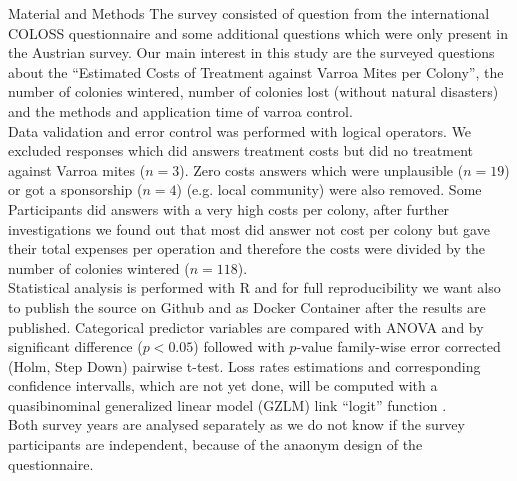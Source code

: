\documentclass{beamer}
\begin{document}
\begin{frame}{}
\begin{columns}[t]
\begin{column}{0.49\textwidth}
    \begin{block}{Material and Methods}
      The survey consisted of question from the international COLOSS questionnaire and some additional questions which were only present in the Austrian survey. Our main interest in this study are the surveyed questions about the \enquote{Estimated Costs of Treatment against Varroa Mites per Colony}, the number of colonies wintered, number of colonies lost (without natural disasters) and the methods and application time of varroa control. \\
      Data validation and error control was performed with logical operators. We excluded responses which did answers treatment costs but did no treatment against Varroa mites ($n=3$). Zero costs answers which were unplausible ($n=19$) or got a sponsorship ($n=4$) (e.g. local community) were also removed. Some Participants did answers with a very high costs per colony, after further investigations we found out that most did answer not cost per colony but gave their total expenses per operation and therefore the costs were divided by the number of colonies wintered ($n=118$). \\
      Statistical analysis is performed with R and for full reproducibility we want also to publish the source on Github and as Docker Container after the results are published. Categorical predictor variables are compared with ANOVA and by significant difference ($p<0.05$) followed with $p$-value family-wise error corrected (Holm, Step Down) pairwise t-test. Loss rates estimations and corresponding confidence intervalls, which are not yet done, will be computed with a quasibinominal generalized linear model (GZLM) link \enquote{logit} function \citep{vanderzee2013}. \\
      Both survey years are analysed separately as we do not know if the survey participants are independent, because of the anaonym design of the questionnaire.
    \end{block}


\end{column}
\end{columns}
\end{frame}
\end{document}
